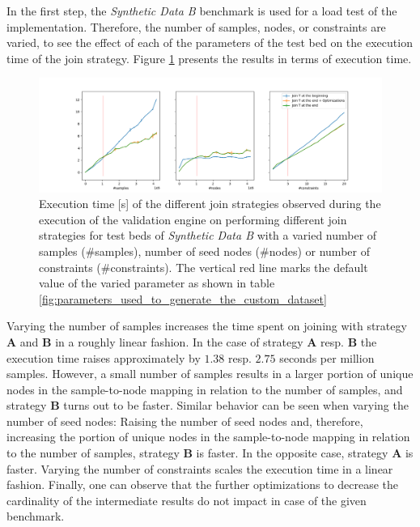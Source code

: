 In the first step, the \textit{Synthetic Data B} benchmark is used for a load test of the implementation. Therefore, the number of samples, nodes, or constraints are varied, to see the effect of each of the parameters of the test bed on the execution time of the join strategy. Figure \ref{fig:load_test_join} presents the results in terms of execution time. 

\begin{figure}
    \centering
    \includegraphics[trim=70 10 70 20,clip, width=\textwidth]{images/evaluation/join_exp.png}
    \caption{Execution time [s] of the different join strategies observed during the execution of the validation engine on performing different join strategies for test beds of \textit{Synthetic Data B} with a varied number of samples (\#samples), number of seed nodes (\#nodes) or number of constraints (\#constraints). The vertical red line marks the default value of the varied parameter as shown in table \ref{fig:parameters_used_to_generate_the_custom_dataset}}
    \label{fig:load_test_join}
\end{figure}

Varying the number of samples increases the time spent on joining with strategy \textbf{A} and \textbf{B} in a roughly linear fashion. In the case of strategy \textbf{A} resp. \textbf{B} the execution time raises approximately by $1.38$ resp. $2.75$ seconds per million samples. However, a small number of samples results in a larger portion of unique nodes in the sample-to-node mapping in relation to the number of samples, and strategy \textbf{B} turns out to be faster. Similar behavior can be seen when varying the number of seed nodes: Raising the number of seed nodes and, therefore, increasing the portion of unique nodes in the sample-to-node mapping in relation to the number of samples, strategy \textbf{B} is faster. In the opposite case, strategy \textbf{A} is faster. Varying the number of constraints scales the execution time in a linear fashion. %
Finally, one can observe that the further optimizations to decrease the cardinality of the intermediate results do not impact in case of the given benchmark. 

